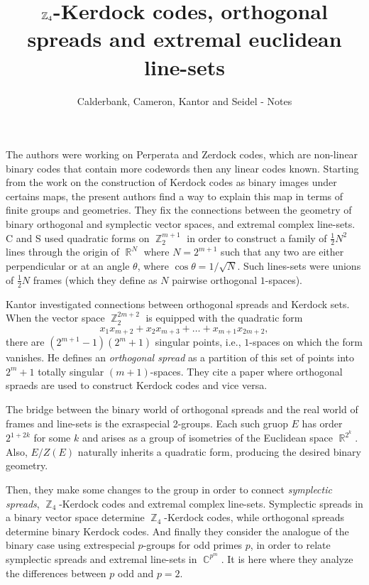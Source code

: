 \documentclass[a4paper]{article}
\title{$\Z_4$-Kerdock codes, orthogonal spreads and extremal
euclidean line-sets}
\author{Calderbank, Cameron, Kantor and Seidel - Notes}
\DeclareMathOperator{\R}{\mathbb{R}}
\DeclareMathOperator{\C}{\mathbb{C}}
\DeclareMathOperator{\Z}{\mathbb{Z}}
\begin{document}
  \maketitle

  The authors were working on Perperata and Zerdock codes,
  which are non-linear binary codes that contain more
  codewords then any linear codes known. Starting from the
  work on the construction of Kerdock codes as binary images
  under certains maps, the present authors find a way to
  explain this map in terms of finite groups and geometries.
  They fix the connections between the geometry of binary
  orthogonal and symplectic vector spaces, and extremal
  complex line-sets. C and S used quadratic forms on
  $\Z_2^{m+1}$ in order to construct a family of
  $\frac{1}{2}N^2$ lines through the origin of $\R^{N}$ 
  where $N = 2^{m+1}$ such that any two are either
  perpendicular or at an angle $\theta$, where $\cos \theta
  = 1 / \sqrt{N}$. Such lines-sets were unions of
  $\frac{1}{2}N$ frames (which they define as $N$ pairwise
  orthogonal $1$-spaces).

  Kantor investigated connections between orthogonal spreads
  and Kerdock sets. When the vector space $\Z_2^{2m+2}$ is
  equipped with the quadratic form
  \[
    x_1x_{m+2} + x_2x_{m+3} + \ldots + x_{m+1}x_{2m+2},
  \] 
  there are $(2^{m+1}-1)(2^{m}+1)$ singular points, i.e.,
  $1$-spaces on which the form vanishes. He defines an
  \textit{orthogonal spread} as a partition of this set of
  points into $2^{m}+1$ totally singular $(m+1)$-spaces.
  They cite a paper where orthogonal spraeds are used to
  construct Kerdock codes and vice versa.

  The bridge between the binary world of orthogonal spreads
  and the real world of frames and line-sets is the
  exraspecial 2-groups. Each such gruop $E$ has order
  $2^{1+2k}$ for some $k$ and arises as a group of
  isometries of the Euclidean space $\R^{2^{k}}$. Also, $E /
  Z(E)$ naturally inherits a quadratic form, producing the
  desired binary geometry.

  Then, they make some changes to the group in order to
  connect \textit{symplectic spreads},  $\Z_4$-Kerdock codes
  and extremal complex line-sets. Symplectic spreads in a
  binary vector space determine $\Z_4$-Kerdock codes, while
  orthogonal spreads determine binary Kerdock codes. And
  finally they consider the analogue of the binary case
  using extrespecial $p$-groups for odd primes $p$, in order
  to relate symplectic spreads and extremal line-sets in
  $\C^{p^{m}}$. It is here where they analyze the
  differences between $p$ odd and $p = 2$.
\end{document}
